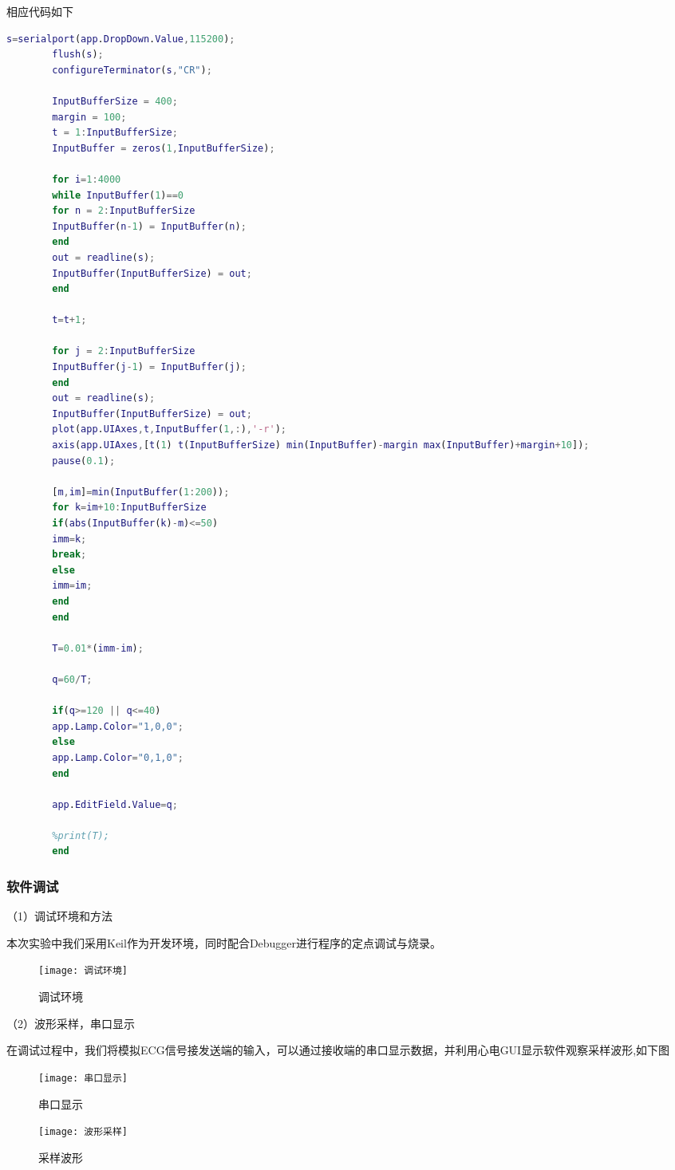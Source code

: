\documentclass{zjureport}
\begin{document}
	相应代码如下
	\begin{lstlisting}[language=Matlab]
		s=serialport(app.DropDown.Value,115200);
		flush(s);
		configureTerminator(s,"CR");
		
		InputBufferSize = 400;
		margin = 100;
		t = 1:InputBufferSize;
		InputBuffer = zeros(1,InputBufferSize);
		
		for i=1:4000
		while InputBuffer(1)==0
		for n = 2:InputBufferSize
		InputBuffer(n-1) = InputBuffer(n);
		end
		out = readline(s); 
		InputBuffer(InputBufferSize) = out;
		end
		
		t=t+1;
		
		for j = 2:InputBufferSize
		InputBuffer(j-1) = InputBuffer(j);
		end
		out = readline(s); 
		InputBuffer(InputBufferSize) = out;
		plot(app.UIAxes,t,InputBuffer(1,:),'-r');
		axis(app.UIAxes,[t(1) t(InputBufferSize) min(InputBuffer)-margin max(InputBuffer)+margin+10]);
		pause(0.1);
		
		[m,im]=min(InputBuffer(1:200));
		for k=im+10:InputBufferSize
		if(abs(InputBuffer(k)-m)<=50)
		imm=k;
		break;
		else
		imm=im;
		end
		end
		
		T=0.01*(imm-im);
		
		q=60/T;
		
		if(q>=120 || q<=40)
		app.Lamp.Color="1,0,0";
		else
		app.Lamp.Color="0,1,0";
		end
		
		app.EditField.Value=q;
		
		%print(T);
		end
	\end{lstlisting} 
	
	\subsubsection{软件调试}
	
	（1）调试环境和方法
	
	本次实验中我们采用Keil作为开发环境，同时配合Debugger进行程序的定点调试与烧录。
	
	\begin{figure}[H]
		\centering%
		\texttt{[image: 调试环境]}
		\caption{调试环境}%
	\end{figure}
	
	\newpage
	
	（2）波形采样，串口显示   
	              
	 在调试过程中，我们将模拟ECG信号接发送端的输入，可以通过接收端的串口显示数据，并利用心电GUI显示软件观察采样波形,如下图
	 
	 \begin{figure}[H]
	 	\centering
	 	\begin{minipage}[t]{0.49\linewidth}%
	 		\texttt{[image: 串口显示]}%
	 		\caption{串口显示}
	 	\end{minipage}%
	 	\begin{minipage}[t]{0.49\linewidth}
	 		\texttt{[image: 波形采样]}
	 		\caption{采样波形}
	 	\end{minipage}
	 \end{figure}           
	              
\end{document}
